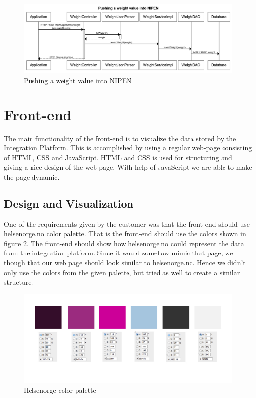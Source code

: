 \begin{figure}[h]
\centering
\includegraphics[scale=0.55]{../Figures/pushing-weight-into-NIPEN.png}
\caption{Pushing a weight value into NIPEN}
\label{figure:pushing-weight-into-NIPEN}
\end{figure}

\section{Front-end}
\label{subsec:front-end}

The main functionality of the front-end is to visualize the data stored by the Integration Platform.
This is accomplished by using a regular web-page consisting of HTML, CSS and JavaScript. HTML and CSS is used for structuring and giving a nice design of the web page. With help of JavaScript we are able to make the page dynamic.

\subsection{Design and Visualization}

One of the requirements given by the customer was that the front-end should use helsenorge.no color palette. 
That is the front-end should use the colors shown in figure \ref{figure:helsenorge-color-palette}. 
The front-end should show how helsenorge.no could represent the data from the integration platform. 
Since it would somehow mimic that page, we though that our web page should look similar to helsenorge.no. 
Hence we didn't only use the colors from the given palette, but tried as well to create a similar structure.

\begin{figure}[h]
\centering
\includegraphics[scale=0.30]{../Figures/helsenorge_pallett.jpg}
\caption{Helsenorge color palette}
\label{figure:helsenorge-color-palette}
\end{figure}

